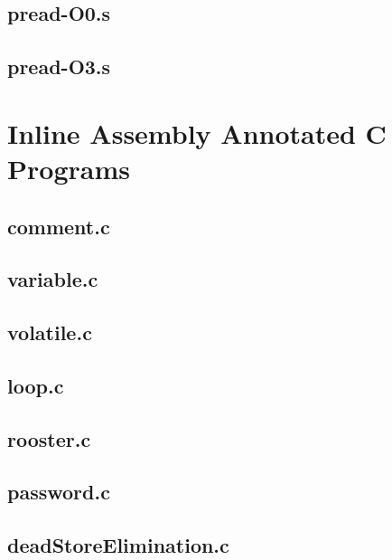 \begin{appendices}
\section{pread-O0.s}

\section{pread-O3.s}


\chapter{Inline Assembly Annotated C Programs}
\label{app:InlineC}
\section{comment.c}


\section{variable.c}


\section{volatile.c}


\section{loop.c}


\section{rooster.c}


\section{password.c}


\section{deadStoreElimination.c}



\end{appendices}
